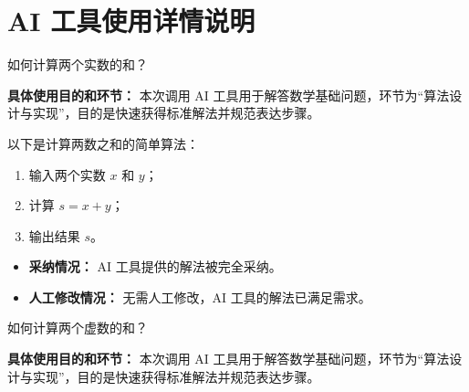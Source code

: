 \section{AI 工具使用详情说明}


\begin{block}[colback=orange!10, colframe=orange!60, title={\textcolor{black}{用户提问}}]
如何计算两个实数的和？
\vspace{0.5em}
\begin{flushright}
    \scriptsize
    \begin{flushleft}
        \textbf{具体使用目的和环节：} 本次调用 AI 工具用于解答数学基础问题，环节为“算法设计与实现”，目的是快速获得标准解法并规范表达步骤。
    \end{flushleft}
\end{flushright}
\end{block}


\begin{GPTblock}
以下是计算两数之和的简单算法：
\begin{enumerate}
    \item 输入两个实数 $x$ 和 $y$；
    \item 计算 $s = x + y$；
    \item 输出结果 $s$。
\end{enumerate}
\end{GPTblock}

\begin{block}[colback=green!10, colframe=green!50, title={\textcolor{black}{采纳和人工修改情况}}]
\begin{itemize}
    \item \textbf{采纳情况：} AI 工具提供的解法被完全采纳。
    \item \textbf{人工修改情况：} 无需人工修改，AI 工具的解法已满足需求。
\end{itemize}
\end{block}

\newpage
\begin{block}[colback=orange!10, colframe=orange!60, title={\textcolor{black}{用户提问}}]
如何计算两个虚数的和？
\vspace{0.5em}
\begin{flushright}
    \scriptsize
    \begin{flushleft}
        \textbf{具体使用目的和环节：} 本次调用 AI 工具用于解答数学基础问题，环节为“算法设计与实现”，目的是快速获得标准解法并规范表达步骤。
    \end{flushleft}
\end{flushright}
\end{block}

